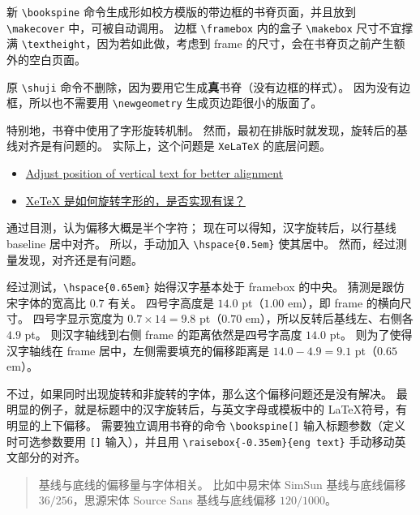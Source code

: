 \documentclass[../Main/thesis.tex]{subfiles}
\begin{document}
新 \texttt{\textbackslash{}bookspine}
命令生成形如校方模版的带边框的书脊页面，并且放到
\texttt{\textbackslash{}makecover} 中，可被自动调用。 边框
\texttt{\textbackslash{}framebox} 内的盒子
\texttt{\textbackslash{}makebox} 尺寸不宜撑满
\texttt{\textbackslash{}textheight}，因为若如此做，考虑到 frame
的尺寸，会在书脊页之前产生额外的空白页面。

原 \texttt{\textbackslash{}shuji}
命令不删除，因为要用它生成\textbf{真}书脊（没有边框的样式）。
因为没有边框，所以也不需要用 \texttt{\textbackslash{}newgeometry}
生成页边距很小的版面了。

特别地，书脊中使用了字形旋转机制。
然而，最初在排版时就发现，旋转后的基线对齐是有问题的。
实际上，这个问题是 \texttt{XeLaTeX} 的底层问题。


\begin{itemize}
\item
  \href{https://sourceforge.net/p/xetex/bugs/164/}{Adjust position of
  vertical text for better alignment}
\item
  \href{https://github.com/CTeX-org/forum/issues/93}{XeTeX
  是如何旋转字形的，是否实现有误？}
\end{itemize}

通过目测，认为偏移大概是半个字符； 现在可以得知，汉字旋转后，以行基线
baseline 居中对齐。 所以，手动加入
\texttt{\textbackslash{}hspace\{0.5em\}} 使其居中。
然而，经过测量发现，对齐还是有问题。

经过测试，\texttt{\textbackslash{}hspace\{0.65em\}} 始得汉字基本处于
framebox 的中央。 猜测是跟仿宋字体的宽高比 \(0.7\) 有关。 四号字高度是
\(14.0\) pt（\(1.00\) em），即 frame 的横向尺寸。 四号字显示宽度为
\(0.7 \times 14 = 9.8\) pt（\(0.70\) em），所以反转后基线左、右侧各
\(4.9\) pt。 则汉字轴线到右侧 frame 的距离依然是四号字高度 \(14.0\) pt。
则为了使得汉字轴线在 frame 居中，左侧需要填充的偏移距离是
\(14.0-4.9=9.1\) pt（\(0.65\) em）。

不过，如果同时出现旋转和非旋转的字体，那么这个偏移问题还是没有解决。
最明显的例子，就是标题中的汉字旋转后，与英文字母或模板中的 \LaTeX 符号，有明显的上下偏移。 需要独立调用书脊的命令
\texttt{\textbackslash{}bookspine[]}
输入标题参数（定义时可选参数要用 \texttt{[]} 输入），并且用
\texttt{\textbackslash{}raisebox\{-0.35em\}\{eng\ text\}}
手动移动英文部分的对齐。

\begin{quote}
基线与底线的偏移量与字体相关。 比如中易宋体 SimSun 基线与底线偏移
\(36/256\)，思源宋体 Source Sans 基线与底线偏移 \(120/1000\)。
\end{quote}
\end{document}
